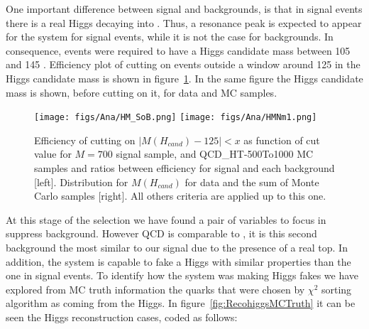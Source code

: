 One important difference between signal and backgrounds, is that in signal events there is a real Higgs decaying into \bbbar. Thus, a resonance peak is expected to appear for the \bbbar system for signal events, while it is not the case for backgrounds. In consequence, events were required to have a Higgs candidate mass between 105 and 145 \GeVcc. Efficiency plot of cutting on events outside a window around 125 \GeVcc in the Higgs candidate mass is shown in figure~\ref{fig:HiggsMassDMC}. In the same figure the Higgs candidate mass is shown, before cutting on it, for data and MC samples.

\begin{figure}[!Hhtbp]
  \begin{center}
    \texttt{[image: figs/Ana/HM\_SoB.png]}
    \texttt{[image: figs/Ana/HMNm1.png]}
    \caption{Efficiency of cutting on $|M(H_{cand})-125|<x$ as function of cut value for $M=700$ \GeVcc signal sample, \ttbar and QCD\_HT-500To1000 MC samples and ratios between efficiency for signal and each background [left]. Distribution for $M(H_{cand})$ for data and the sum of Monte Carlo samples [right]. All others criteria are applied up to this one.}
    \label{fig:HiggsMassDMC}
  \end{center}
\end{figure}

At this stage of the selection we have found a pair of variables to focus in suppress \ttbar background. However QCD is comparable to \ttbar, it is this second background the most similar to our signal due to the presence of a real top. In addition, the \ttbar system is capable to fake a Higgs with similar properties than the one in signal events. To identify how the \ttbar system was making Higgs fakes we have explored from MC truth information the quarks that were chosen by $\chi^{2}$ sorting algorithm as coming from the Higgs. In figure~\ref{fig:RecohiggsMCTruth} it can be seen the Higgs reconstruction cases, coded as follows:

